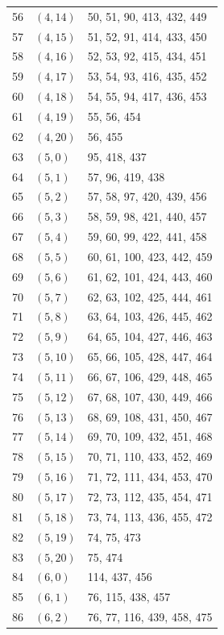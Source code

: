 \documentclass{article}
\begin{document}
\begin{longtable}{lll}
  56 & \((4, 14)\) & 50, 51, 90, 413, 432, 449 \\
  57 & \((4, 15)\) & 51, 52, 91, 414, 433, 450 \\
  58 & \((4, 16)\) & 52, 53, 92, 415, 434, 451 \\
  59 & \((4, 17)\) & 53, 54, 93, 416, 435, 452 \\
  60 & \((4, 18)\) & 54, 55, 94, 417, 436, 453 \\
  61 & \((4, 19)\) & 55, 56, 454 \\
  62 & \((4, 20)\) & 56, 455 \\
  63 & \((5, 0)\) & 95, 418, 437 \\
  64 & \((5, 1)\) & 57, 96, 419, 438 \\
  65 & \((5, 2)\) & 57, 58, 97, 420, 439, 456 \\
  66 & \((5, 3)\) & 58, 59, 98, 421, 440, 457 \\
  67 & \((5, 4)\) & 59, 60, 99, 422, 441, 458 \\
  68 & \((5, 5)\) & 60, 61, 100, 423, 442, 459 \\
  69 & \((5, 6)\) & 61, 62, 101, 424, 443, 460 \\
  70 & \((5, 7)\) & 62, 63, 102, 425, 444, 461 \\
  71 & \((5, 8)\) & 63, 64, 103, 426, 445, 462 \\
  72 & \((5, 9)\) & 64, 65, 104, 427, 446, 463 \\
  73 & \((5, 10)\) & 65, 66, 105, 428, 447, 464 \\
  74 & \((5, 11)\) & 66, 67, 106, 429, 448, 465 \\
  75 & \((5, 12)\) & 67, 68, 107, 430, 449, 466 \\
  76 & \((5, 13)\) & 68, 69, 108, 431, 450, 467 \\
  77 & \((5, 14)\) & 69, 70, 109, 432, 451, 468 \\
  78 & \((5, 15)\) & 70, 71, 110, 433, 452, 469 \\
  79 & \((5, 16)\) & 71, 72, 111, 434, 453, 470 \\
  80 & \((5, 17)\) & 72, 73, 112, 435, 454, 471 \\
  81 & \((5, 18)\) & 73, 74, 113, 436, 455, 472 \\
  82 & \((5, 19)\) & 74, 75, 473 \\
  83 & \((5, 20)\) & 75, 474 \\
  84 & \((6, 0)\) & 114, 437, 456 \\
  85 & \((6, 1)\) & 76, 115, 438, 457 \\
  86 & \((6, 2)\) & 76, 77, 116, 439, 458, 475 \\

\end{longtable}
\end{document}
